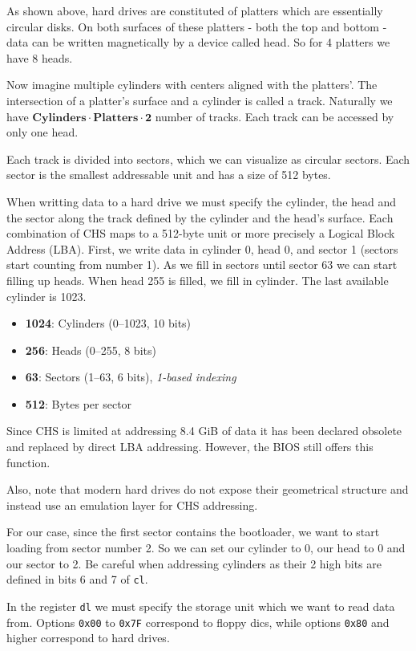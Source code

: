 As shown above, hard drives are constituted of platters which are essentially circular disks. On both surfaces
of these platters - both the top and bottom - data can be written magnetically by a device called head. So for 
4 platters we have 8 heads. 

Now imagine multiple cylinders with centers aligned with the platters'. The intersection of a platter's surface 
and a cylinder is called a track. Naturally we have \(\textbf{Cylinders} \cdot \textbf{Platters} \cdot \textbf{2}\)
number of tracks. Each track can be accessed by only one head.

Each track is divided into sectors, which we can visualize as circular sectors. Each sector is the smallest addressable
unit and has a size of 512 bytes.

When writting data to a hard drive we must specify the cylinder, the head and the sector along the track defined by the
cylinder and the head's surface. Each combination of CHS maps to a 512-byte unit or more precisely a Logical Block 
Address (LBA). First, we write data in cylinder 0, head 0, and sector 1 (sectors start counting from number 1). As we 
fill in sectors until sector 63 we can start filling up heads. When head 255 is filled, we fill in cylinder. The 
last available cylinder is 1023. 

\begin{itemize}
    \item \textbf{1024}: Cylinders (0–1023, 10 bits)
    \item \textbf{256}: Heads (0–255, 8 bits)
    \item \textbf{63}: Sectors (1–63, 6 bits), \textit{1-based indexing}
    \item \textbf{512}: Bytes per sector
\end{itemize}
  
Since CHS is limited at addressing 8.4 GiB of data it has been declared obsolete and replaced by direct LBA addressing.
However, the BIOS still offers this function.

Also, note that modern hard drives do not expose their geometrical structure and instead use an emulation layer for
CHS addressing.

For our case, since the first sector contains the bootloader, we want to start loading from sector number 2.
So we can set our cylinder to 0, our head to 0 and our sector to 2. Be careful when addressing cylinders
as their 2 high bits are defined in bits 6 and 7 of \texttt{cl}.

In the register \texttt{dl} we must specify the storage unit which we want to read data from.
Options \texttt{0x00} to \texttt{0x7F} correspond to floppy dics, while options \texttt{0x80} and higher
correspond to hard drives.

